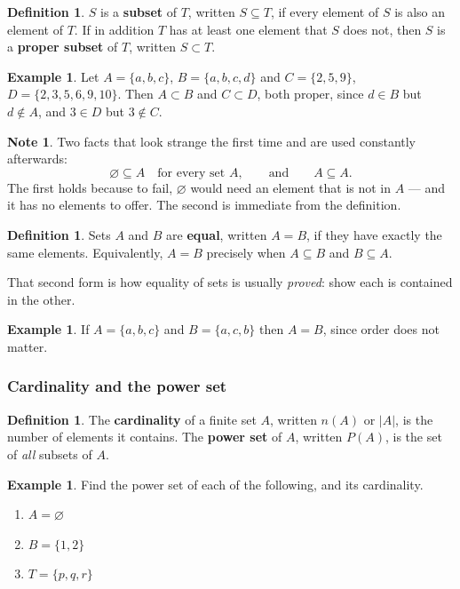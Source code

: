 \documentclass[11pt,a4paper]{article}
\theoremstyle{definition}
\newtheorem{definition}[thm]{Definition}
\newtheorem{example}[thm]{Example}
\newtheorem{note}[thm]{Note}
\begin{document}
\begin{definition}
$S$ is a \textbf{subset} of $T$, written $S\subseteq T$, if every element of $S$ is
also an element of $T$. If in addition $T$ has at least one element that $S$ does not,
then $S$ is a \textbf{proper subset} of $T$, written $S\subset T$.
\end{definition}

\begin{example}
Let $A=\{a,b,c\}$, $B=\{a,b,c,d\}$ and $C=\{2,5,9\}$, $D=\{2,3,5,6,9,10\}$. Then
$A\subset B$ and $C\subset D$, both proper, since $d\in B$ but $d\notin A$, and
$3\in D$ but $3\notin C$.
\end{example}

\begin{note}
Two facts that look strange the first time and are used constantly afterwards:
$$\varnothing\subseteq A\quad\text{for every set } A,\qquad\text{and}\qquad A\subseteq A.$$
The first holds because to fail, $\varnothing$ would need an element that is not in
$A$ --- and it has no elements to offer. The second is immediate from the definition.
\end{note}

\begin{definition}
Sets $A$ and $B$ are \textbf{equal}, written $A=B$, if they have exactly the same
elements. Equivalently, $A=B$ precisely when $A\subseteq B$ and $B\subseteq A$.
\end{definition}

That second form is how equality of sets is usually \emph{proved}: show each is
contained in the other.

\begin{example}
If $A=\{a,b,c\}$ and $B=\{a,c,b\}$ then $A=B$, since order does not matter.
\end{example}

\subsubsection{Cardinality and the power set}

\begin{definition}
The \textbf{cardinality} of a finite set $A$, written $n(A)$ or $|A|$, is the number
of elements it contains. The \textbf{power set} of $A$, written $P(A)$, is the set of
\emph{all} subsets of $A$.
\end{definition}

\begin{example}
Find the power set of each of the following, and its cardinality.
\begin{enumerate}
\item[(a).] $A=\varnothing$
\item[(b).] $B=\{1,2\}$
\item[(c).] $T=\{p,q,r\}$
\end{enumerate}
\end{example}
\end{document}
